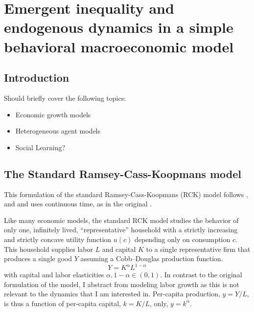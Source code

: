 \chapter{Emergent inequality and endogenous dynamics in a simple behavioral macroeconomic model}

\section{Introduction}
Should briefly cover the following topics:
\begin{itemize}
  \item Economic growth models
  \item Heterogeneous agent models
  \item Social Learning?
\end{itemize}
\newpage
\section{The Standard Ramsey-Cass-Koopmans model}

This formulation of the standard Ramsey-Cass-Koopmans (RCK) model follows \cite[p.287--317]{Acemoglu2009}, \cite[p.85--135]{Barro2004}  and \cite[p.38--90]{Blanchard1989} and uses continuous time, as in the original \citep{Ramsey1928}.

Like many economic models, the standard RCK model studies the behavior of only one, infinitely lived, ``representative'' household with a strictly increasing and strictly concave utility function $u(c)$ depending only on consumption $c$. This household supplies labor $L$ and capital $K$ to a single representative firm that produces a single good $Y$ assuming a Cobb--Douglas production function.
\begin{equation}
  Y \! =\! K^\alpha L^{1-\alpha}\label{eq:CD-Production}
\end{equation} 
with capital and labor elasticities $\alpha, 1 \!- \! \alpha \in (0,1)$.
In contrast to the original formulation of the model, I abstract from modeling labor growth as this is not relevant to the dynamics that I am interested in.
Per-capita production, $y \! =\! Y/L$, is thus a function of per-capita capital, $k \! =\! K/L$, only, $y \! =\! k^\alpha$.

